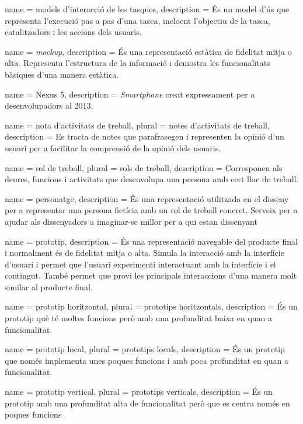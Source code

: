 {
name = models d'interacció de les tasques, description = {És un model d'ús que representa l'execució pas a pas d'una tasca, incloent l'objectiu de la tasca, catalitzadors i les accions dels usuaris.}
}

{
name = \textit{mockup}, description = {És una representació estàtica de fidelitat mitja o alta.  Representa l'estructura de la informació i demostra les funcionalitats bàsiques d'una manera estàtica.}
}

{
name = Nexus 5, description = {\textit{Smartphone} creat expressament per a desenvolupadors al 2013.}  
}

{
name = nota d'activitats de treball, plural = notes d'activitats de treball, description = {Es tracta de notes que parafrasegen i representen la opinió d'un usuari per a facilitar la comprensió de la opinió dels usuaris.}  
}

{
name = rol de treball, plural = rols de treball, description = {Corresponen als deures, funcions i activitats que desenvolupa una persona amb cert lloc de treball.}  
}

{
name = personatge, description = {És una representació utilitzada en el disseny per a representar una persona fictícia amb un rol de treball concret. Serveix per a ajudar als dissenyadors a imaginar-se millor per a qui estan dissenyant}  
}

{
name = prototip, description = {És una representació navegable del producte final i normalment és de fidelitat mitja o alta. Simula la interacció amb la interfície d'usuari i permet que l'usuari experimenti interactuant amb la interfície i el contingut. També permet que provi les principals interaccions d'una manera molt similar al producte final.}
}

{
name = prototip horitzontal, plural = prototips horitzontals, description = {És un prototip què té moltes funcions però amb una profunditat baixa en quan a funcionalitat.}
}

{
name = prototip local, plural = prototips locals, description = {És un prototip que només implementa unes poques funcions i amb poca profunditat en quan a funcionalitat.}
}

{
name = prototip vertical, plural = prototips verticals, description = {És un prototip amb una profunditat alta de funcionalitat però que es centra només en poques funcions}
}

